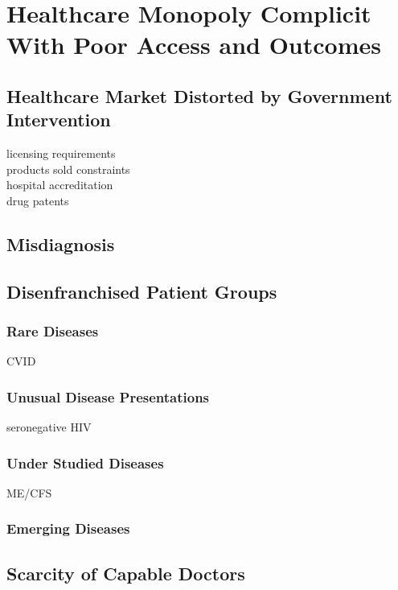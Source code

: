 \documentclass{article}
\begin{document}
\section{Healthcare Monopoly Complicit With Poor Access and Outcomes}

\subsection{Healthcare Market Distorted by Government Intervention}

licensing requirements\\
products sold constraints\\
hospital accreditation\\
drug patents

\subsection{Misdiagnosis}
\cite{singh2014frequency}

\subsection{Disenfranchised Patient Groups}

\subsubsection{Rare Diseases}

CVID

\subsubsection{Unusual Disease Presentations}

seronegative HIV

\subsubsection{Under Studied Diseases}

ME/CFS

\subsubsection{Emerging Diseases}

\subsection{Scarcity of Capable Doctors}
\end{document}
